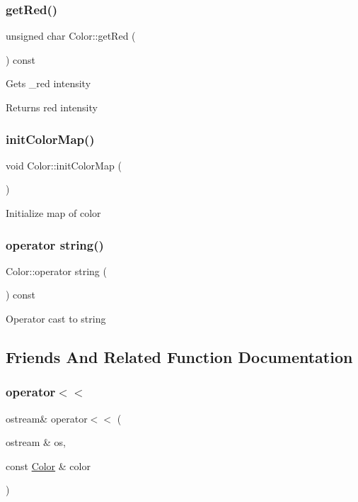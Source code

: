 \subsubsection{\texorpdfstring{get\+Red()}{getRed()}}
{\footnotesize\ttfamily unsigned char Color\+::get\+Red (\begin{DoxyParamCaption}{ }\end{DoxyParamCaption}) const}

Gets \+\_\+red intensity \begin{DoxyReturn}{Returns}
red intensity 
\end{DoxyReturn}
\hypertarget{class_color_aba1211bd466bce64d3076af2a55d9785}{}\label{class_color_aba1211bd466bce64d3076af2a55d9785} 
\subsubsection{\texorpdfstring{init\+Color\+Map()}{initColorMap()}}
{\footnotesize\ttfamily void Color\+::init\+Color\+Map (\begin{DoxyParamCaption}{ }\end{DoxyParamCaption})\hspace{0.3cm}{\ttfamily [static]}}

Initialize map of color \hypertarget{class_color_ac245c9d05bd9409245905b6f15c30f1a}{}\label{class_color_ac245c9d05bd9409245905b6f15c30f1a} 
\subsubsection{\texorpdfstring{operator string()}{operator string()}}
{\footnotesize\ttfamily Color\+::operator string (\begin{DoxyParamCaption}{ }\end{DoxyParamCaption}) const}

Operator cast to string 

\subsection{Friends And Related Function Documentation}
\hypertarget{class_color_aaa4c7d27cb5d200e5d58e49962d9d9e8}{}\label{class_color_aaa4c7d27cb5d200e5d58e49962d9d9e8} 
\subsubsection{\texorpdfstring{operator$<$$<$}{operator<<}}
{\footnotesize\ttfamily ostream\& operator$<$$<$ (\begin{DoxyParamCaption}\item[{ostream \&}]{os,  }\item[{const \hyperlink{class_color}{Color} \&}]{color }\end{DoxyParamCaption})\hspace{0.3cm}{\ttfamily [friend]}}




